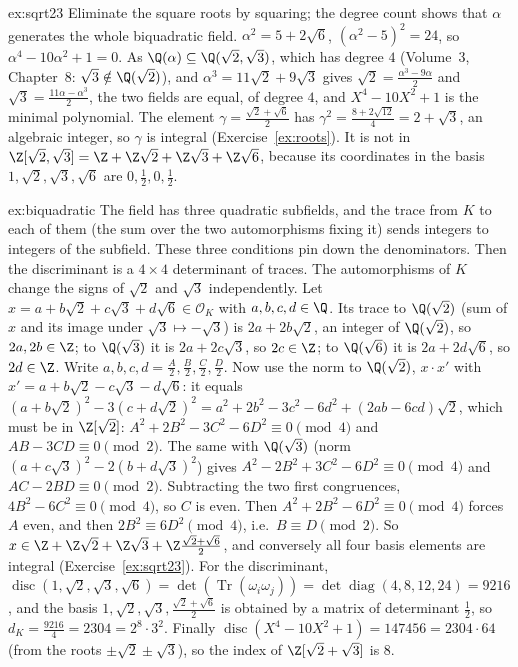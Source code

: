 \begin{solution}{ex:sqrt23}
\idea Eliminate the square roots by squaring; the degree count shows that $\alpha$ generates the whole biquadratic field.
\writeup $\alpha^2=5+2\sqrt6$, $(\alpha^2-5)^2=24$, so $\alpha^4-10\alpha^2+1=0$. As $\Q(\alpha)\subseteq\Q(\sqrt2,\sqrt3)$,
which has degree $4$ (Volume~3, Chapter~8: $\sqrt3\notin\Q(\sqrt2)$), and $\alpha^3=11\sqrt2+9\sqrt3$ gives
$\sqrt2=\frac{\alpha^3-9\alpha}2$ and $\sqrt3=\frac{11\alpha-\alpha^3}2$, the two fields are equal, of degree $4$, and
$X^4-10X^2+1$ is the minimal polynomial. The element $\gamma=\frac{\sqrt2+\sqrt6}2$ has $\gamma^2=\frac{8+2\sqrt{12}}4=
2+\sqrt3$, an algebraic integer, so $\gamma$ is integral (Exercise~\ref{ex:roots}). It is not in
$\Z[\sqrt2,\sqrt3]=\Z+\Z\sqrt2+\Z\sqrt3+\Z\sqrt6$, because its coordinates in the basis $1,\sqrt2,\sqrt3,\sqrt6$ are
$0,\frac12,0,\frac12$.
\end{solution}

\begin{solution}{ex:biquadratic}
\idea The field has three quadratic subfields, and the trace from $K$ to each of them (the sum over the two
automorphisms fixing it) sends integers to integers of the subfield. These three conditions pin down the
denominators. Then the discriminant is a $4\times4$ determinant of traces.
\writeup The automorphisms of $K$ change the signs of $\sqrt2$ and $\sqrt3$ independently. Let
$x=a+b\sqrt2+c\sqrt3+d\sqrt6\in\mathcal O_K$ with $a,b,c,d\in\Q$. Its trace to $\Q(\sqrt2)$ (sum of $x$ and its image
under $\sqrt3\mapsto-\sqrt3$) is $2a+2b\sqrt2$, an integer of $\Q(\sqrt2)$, so $2a,2b\in\Z$; to $\Q(\sqrt3)$ it is
$2a+2c\sqrt3$, so $2c\in\Z$; to $\Q(\sqrt6)$ it is $2a+2d\sqrt6$, so $2d\in\Z$. Write $a,b,c,d=\frac{A}2,\frac B2,\frac C2,
\frac D2$. Now use the norm to $\Q(\sqrt2)$, $x\cdot x'$ with $x'=a+b\sqrt2-c\sqrt3-d\sqrt6$: it equals
$(a+b\sqrt2)^2-3(c+d\sqrt2)^2=a^2+2b^2-3c^2-6d^2+(2ab-6cd)\sqrt2$, which must be in $\Z[\sqrt2]$:
$A^2+2B^2-3C^2-6D^2\equiv0\pmod4$ and $AB-3CD\equiv0\pmod2$. The same with $\Q(\sqrt3)$ (norm
$(a+c\sqrt3)^2-2(b+d\sqrt3)^2$) gives $A^2-2B^2+3C^2-6D^2\equiv0\pmod4$ and $AC-2BD\equiv0\pmod2$. Subtracting the
two first congruences, $4B^2-6C^2\equiv0\pmod4$, so $C$ is even. Then $A^2+2B^2-6D^2\equiv0\pmod4$ forces $A$ even, and
then $2B^2\equiv6D^2\pmod4$, i.e.\ $B\equiv D\pmod2$. So $x\in\Z+\Z\sqrt2+\Z\sqrt3+\Z\frac{\sqrt2+\sqrt6}2$, and
conversely all four basis elements are integral (Exercise~\ref{ex:sqrt23}). For the discriminant,
$\operatorname{disc}(1,\sqrt2,\sqrt3,\sqrt6)=\det(\operatorname{Tr}(\omega_i\omega_j))=\det\operatorname{diag}(4,8,12,24)=
9216$, and the basis $1,\sqrt2,\sqrt3,\frac{\sqrt2+\sqrt6}2$ is obtained by a matrix of determinant $\frac12$, so
$d_K=\frac{9216}4=2304=2^8\cdot3^2$. Finally $\operatorname{disc}(X^4-10X^2+1)=147456=2304\cdot64$ (from the roots
$\pm\sqrt2\pm\sqrt3$), so the index of $\Z[\sqrt2+\sqrt3]$ is $8$.
\end{solution}

